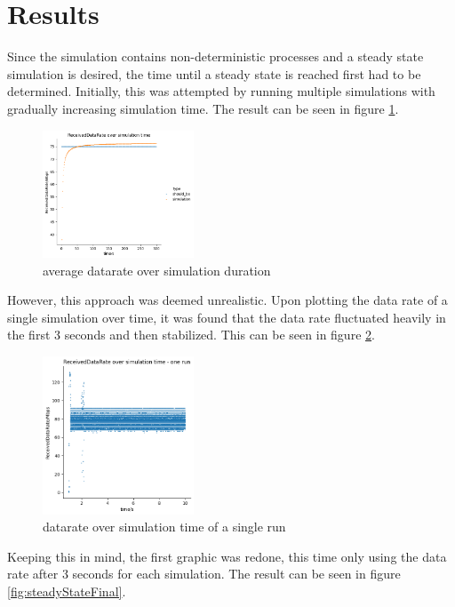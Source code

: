 \section{Results}

Since the simulation contains non-deterministic processes and a steady state simulation is desired,
the time until a steady state is reached first had to be determined. Initially, this was attempted by running multiple
simulations with gradually increasing simulation time. The result can be seen in figure \ref{fig:steadyStateInitial}.
\begin{figure}[ht]
    \centering
    \includegraphics[width=0.4\textwidth]{../DataAnalysis/results/dr_over_time.png}
    \caption{average datarate over simulation duration}
    \label{fig:steadyStateInitial}
\end{figure}
However, this approach was deemed unrealistic. Upon plotting the data rate of a single simulation over time,
it was found that the data rate fluctuated heavily in the first 3 seconds and then stabilized.
This can be seen in figure \ref{fig:steadyStateInitialSingle}.

\begin{figure}[ht]
    \centering
    \includegraphics[width=0.4\textwidth]{../DataAnalysis/results/dr_over_time_single_run.png}
    \caption{datarate over simulation time of a single run}
    \label{fig:steadyStateInitialSingle}
\end{figure}

Keeping this in mind, the first graphic was redone, this time only using the data rate after 3 seconds for each simulation.
The result can be seen in figure \ref{fig:steadyStateFinal}.

